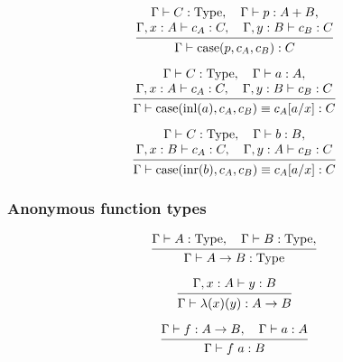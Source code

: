 \documentclass[conference]{IEEEtran}
\begin{document}
\vspace{5pt}

\[
\begin{prooftree}
    \hypo { \Gamma \vdash C : \type,
            \quad \Gamma \vdash p : A + B, }
    \infer[no rule]1 {
            \Gamma, x : A \vdash c_A : C,
            \quad \Gamma, y : B \vdash c_B : C }
    \infer1 { \Gamma \vdash \textrm{case}(p, c_A, c_B) : C }
\end{prooftree}
\]

\vspace{5pt}

\[
\begin{prooftree}
    \hypo { \Gamma \vdash C : \type,
            \quad \Gamma \vdash a : A, }
    \infer[no rule]1 {
            \Gamma, x : A \vdash c_A : C,
            \quad \Gamma, y : B \vdash c_B : C }
    \infer1 { \Gamma \vdash \textrm{case}(\textrm{inl}(a), c_A, c_B) \equiv c_A[a/x] : C }
\end{prooftree}
\]

\vspace{5pt}

\[
\begin{prooftree}
    \hypo { \Gamma \vdash C : \type,
            \quad \Gamma \vdash b : B, }
    \infer[no rule]1 {
            \Gamma, x : B \vdash c_A : C,
            \quad \Gamma, y : A \vdash c_B : C }
    \infer1 { \Gamma \vdash \textrm{case}(\textrm{inr}(b), c_A, c_B) \equiv c_A[a/x] : C }
\end{prooftree}
\]

\subsubsection{Anonymous function types}

\[
\begin{prooftree}
    \hypo { \Gamma \vdash A : \type,
            \quad \Gamma \vdash B : \type, }
    \infer1 { \Gamma \vdash A \rightarrow B : \type }
\end{prooftree}
\]

\[
\begin{prooftree}
    \hypo { \Gamma, x : A \vdash y : B }
    \infer1 { \Gamma \vdash \lambda(x)(y) : A \rightarrow B }
\end{prooftree}
\]

\[
\begin{prooftree}
    \hypo { \Gamma \vdash f : A \rightarrow B,
            \quad \Gamma \vdash a : A }
    \infer1 { \Gamma \vdash f \hspace{3pt} a : B }
\end{prooftree}
\]
\end{document}
